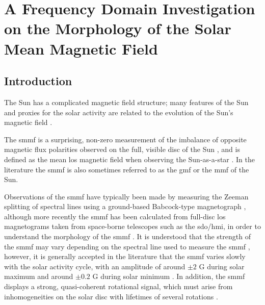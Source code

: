 \chapter{A Frequency Domain Investigation on the Morphology of the Solar Mean Magnetic Field}\label{chap:SMMF}

\section{Introduction}\label{sec:SMMF_intro}

The Sun has a complicated magnetic field structure; many features of the Sun and proxies for the solar activity are related to the evolution of the Sun's magnetic field \citep{wu_solar_2018}.

The \gls{smmf} is a surprising, non-zero measurement of the imbalance of opposite magnetic flux polarities observed on the full, visible disc of the Sun \citep{svalgaard_suns_1975}, and is defined as the mean \gls{los} magnetic field when observing the Sun-as-a-star \citep{scherrer_mean_1977, scherrer_mean_1977-1, garcia_integrated_1999}. In the literature the \gls{smmf} is also sometimes referred to as the \gls{gmf} \citep{severny_time_1971} or the \gls{mmf} \citep{kotov_mean_2008} of the Sun.

Observations of the \gls{smmf} have typically been made by measuring the Zeeman splitting of spectral lines using a ground-based Babcock-type magnetograph \citep{scherrer_mean_1977}, although more recently the \gls{smmf} has been calculated from full-disc \gls{los} magnetograms taken from space-borne telescopes such as the \gls{sdo/hmi}, in order to understand the morphology of the \gls{smmf} \citep{kutsenko_contribution_2017, bose_variability_2018}. It is understood that the strength of the \gls{smmf} may vary depending on the spectral line used to measure the \gls{smmf} \citep{kotov_mean_2008, kotov_enigmas_2012}, however, it is generally accepted in the literature that the \gls{smmf} varies slowly with the solar activity cycle, with an amplitude of around $\pm 2$ G during solar maximum and around $\pm 0.2$ G during solar minimum \citep{plachinda_general_2011}. In addition, the \gls{smmf} displays a strong, quasi-coherent rotational signal, which must arise from inhomogeneities on the solar disc with lifetimes of several rotations \citep{chaplin_studies_2003, xie_temporal_2017}.


